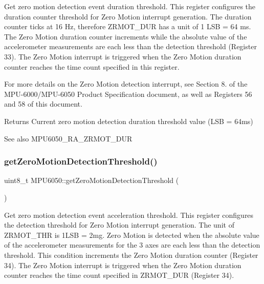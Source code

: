 Get zero motion detection event duration threshold. This register configures the duration counter threshold for Zero Motion interrupt generation. The duration counter ticks at 16 Hz, therefore Z\+R\+M\+O\+T\+\_\+\+D\+UR has a unit of 1 L\+SB = 64 ms. The Zero Motion duration counter increments while the absolute value of the accelerometer measurements are each less than the detection threshold (Register 33). The Zero Motion interrupt is triggered when the Zero Motion duration counter reaches the time count specified in this register.

For more details on the Zero Motion detection interrupt, see Section 8. of the M\+P\+U-\/6000/\+M\+P\+U-\/6050 Product Specification document, as well as Registers 56 and 58 of this document.

\begin{DoxyReturn}{Returns}
Current zero motion detection duration threshold value (L\+SB = 64ms) 
\end{DoxyReturn}
\begin{DoxySeeAlso}{See also}
M\+P\+U6050\+\_\+\+R\+A\+\_\+\+Z\+R\+M\+O\+T\+\_\+\+D\+UR 
\end{DoxySeeAlso}
\mbox{\label{class_m_p_u6050_ad941c1e844dc9230675c115734599ea3}} 
\subsubsection{\texorpdfstring{getZeroMotionDetectionThreshold()}{getZeroMotionDetectionThreshold()}}
{\footnotesize\ttfamily uint8\+\_\+t M\+P\+U6050\+::get\+Zero\+Motion\+Detection\+Threshold (\begin{DoxyParamCaption}{ }\end{DoxyParamCaption})}

Get zero motion detection event acceleration threshold. This register configures the detection threshold for Zero Motion interrupt generation. The unit of Z\+R\+M\+O\+T\+\_\+\+T\+HR is 1L\+SB = 2mg. Zero Motion is detected when the absolute value of the accelerometer measurements for the 3 axes are each less than the detection threshold. This condition increments the Zero Motion duration counter (Register 34). The Zero Motion interrupt is triggered when the Zero Motion duration counter reaches the time count specified in Z\+R\+M\+O\+T\+\_\+\+D\+UR (Register 34).

